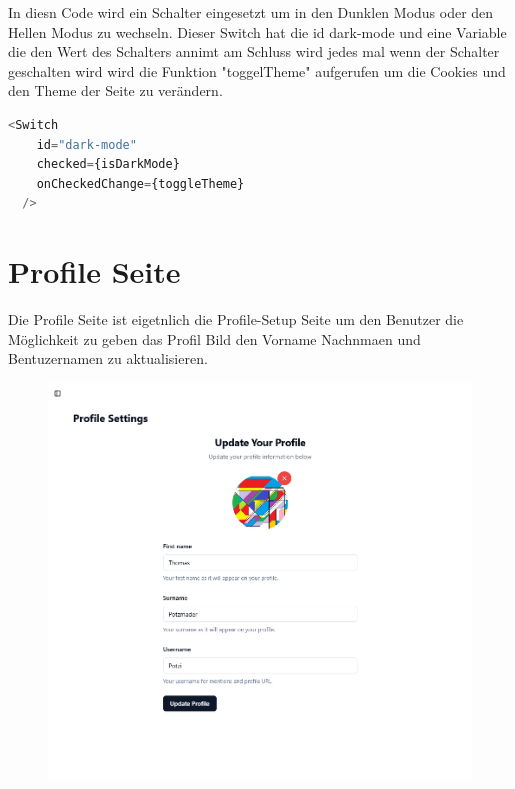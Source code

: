 \begin{inhalt}
\vspace{2cm}

In diesn Code wird ein Schalter eingesetzt um in den Dunklen Modus oder den Hellen Modus zu wechseln. Dieser Switch hat die id dark-mode und eine Variable die den Wert des Schalters annimt am Schluss wird jedes mal wenn der Schalter geschalten wird wird die Funktion "toggelTheme" aufgerufen um die Cookies und den Theme der Seite zu verändern.


\begin{lstlisting}[language=TypeScript]
<Switch
    id="dark-mode"
    checked={isDarkMode}
    onCheckedChange={toggleTheme}
  />
\end{lstlisting}

\newpage

\section{Profile Seite}

Die Profile Seite ist eigetnlich die Profile-Setup Seite um den Benutzer die Möglichkeit zu geben das Profil Bild den Vorname Nachnmaen und Bentuzernamen zu aktualisieren.


\begin{figure}[!htb]
\centering
\includegraphics[width=1\textwidth]{files/Thomas/pics/Website/Profile/profile-screen.png}
\caption[Bildbezeichnung für Abbildungsverzeichnis]{}
\label{fig:gehaeuse_internet_bild}
\end{figure}


\end{inhalt}
